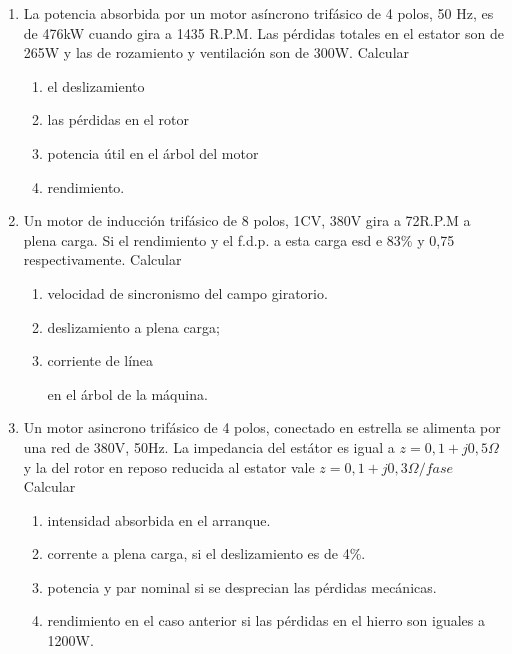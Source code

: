 \documentclass[../main]{subfiles}
\begin{document}
\begin{enumerate}
    \item La potencia absorbida por un motor asíncrono trifásico de 4 polos, 50 Hz, es de 476kW cuando gira a 1435 R.P.M. Las pérdidas totales en el estator son de 265W y las de rozamiento y ventilación son de 300W. 
    Calcular
    \begin{enumerate}
        \item el deslizamiento
        \item las pérdidas en el rotor
        \item potencia útil en el árbol del motor
        \item rendimiento.
    \end{enumerate}
    \item Un motor de inducción trifásico de 8 polos, 1CV, 380V gira a 72R.P.M a plena carga. Si el rendimiento y el f.d.p. a esta carga esd e 83\% y 0,75 respectivamente. Calcular
    \begin{enumerate}
        \item velocidad de sincronismo del campo giratorio.
        \item deslizamiento a plena carga;
        \item corriente de línea
        \par en el árbol de la máquina.
    \end{enumerate}
    \item Un motor asincrono trifásico de 4 polos, conectado en estrella se alimenta por una red de 380V, 50Hz. La impedancia del estátor es igual a $z=0,1 +j0,5\Omega$ y la del rotor en reposo reducida al estator vale $z=0,1+j0,3\Omega/fase$ Calcular
    \begin{enumerate}
        \item intensidad absorbida en el arranque.
        \item corrente a plena carga, si el deslizamiento es de 4\%.
        \item potencia y par nominal si se desprecian las pérdidas mecánicas.
        \item rendimiento en el caso anterior si las pérdidas en el hierro son iguales a 1200W.
    \end{enumerate}
\end{enumerate}
\end{document}
